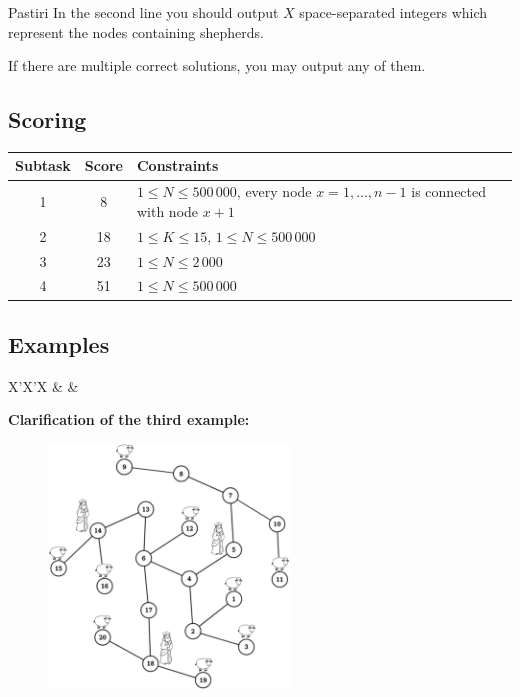 \begin{statement}[
  problempoints=100,
  timelimit=1 second,
  memorylimit=512 MiB,
]{Pastiri}
In the second line you should output $X$ space-separated integers which
represent the nodes containing shepherds.

If there are multiple correct solutions, you may output any of them.

\subsection*{Scoring}
{\renewcommand{\arraystretch}{1.4}
  \setlength{\tabcolsep}{6pt}
  \begin{tabular}{ccl}
 Subtask & Score & Constraints \\ \midrule
  1 & 8 & $1 \le N \le 500\,000$, every node $x = 1, \dots, n-1$ is connected with node $x + 1$\\
  2 & 18 & $1 \le K \le 15 $, $1 \le N \le 500\,000$ \\
  3 & 23 & $1 \le N \le 2\,000$ \\
  4 & 51 & $1 \le N \le 500\,000$ \\
\end{tabular}}

\subsection*{Examples}
\begin{tabularx}{\textwidth}{X'X'X}
 &
 &
\end{tabularx}

\textbf{Clarification of the third example:}
\begin{figure}[H]
\centering
\includegraphics[width=0.57\textwidth]{img/pastiri_tp.png}
\end{figure}

\end{statement}

